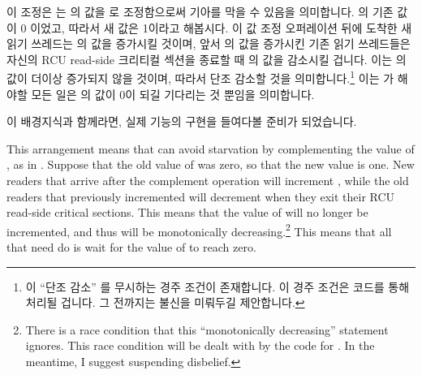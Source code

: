 \iffalse

It is the two-element \co{rcu_refcnt[]} array that provides the freedom
from starvation.
The key point is that \co{synchronize_rcu()} is only required to wait
for pre-existing readers.
If a new reader starts after a given instance of \co{synchronize_rcu()}
has already begun execution, then that instance of \co{synchronize_rcu()}
need not wait on that new reader.
At any given time, when a given reader enters its RCU read-side critical
section via \co{rcu_read_lock()},
it increments the element of the \co{rcu_refcnt[]} array indicated by
the \co{rcu_idx} variable.
When that same reader exits its RCU read-side critical section via
\co{rcu_read_unlock()}, it decrements whichever element it incremented,
ignoring any possible subsequent changes to the \co{rcu_idx} value.

\fi

이 조정은  는  의 값을
 로 조정함으로써 기아를 막을 수 있음을 의미합니다.
 의 기존 값이 0 이었고, 따라서 새 값은 1이라고 해봅시다.
이 값 조정 오퍼레이션 뒤에 도착한 새 읽기 쓰레드는  의 값을
증가시킬 것이며, 앞서  의 값을 증가시킨 기존 읽기 쓰레드들은
자신의 RCU read-side 크리티컬 섹션을 종료할 때  의 값을
감소시킬 겁니다.
이는  의 값이 더이상 증가되지 않을 것이며, 따라서 단조 감소할
것을 의미합니다.\footnote{
	이 ``단조 감소'' 를 무시하는 경주 조건이 존재합니다.
	이 경주 조건은  코드를 통해 처리될 겁니다.
	그 전까지는 불신을 미뤄두길 제안합니다.}
이는  가 해야할 모든 일은  의 값이 0이
되길 기다리는 것 뿐임을 의미합니다.

이 배경지식과 함께라면, 실제 기능의 구현을 들여다볼 준비가 되었습니다.

\iffalse

This arrangement means that  can avoid starvation
by complementing the value of , as in .
Suppose that the old value of  was zero, so that the new
value is one.
New readers that arrive after the complement operation will increment
, while the old readers that previously incremented
 will decrement  when they exit their
RCU read-side critical sections.
This means that the value of  will no longer be incremented,
and thus will be monotonically decreasing.\footnote{
	There is a race condition that this ``monotonically decreasing''
	statement ignores.
	This race condition will be dealt with by the code for
	.
	In the meantime, I suggest suspending disbelief.}
This means that all that  need do is wait for the
value of  to reach zero.

